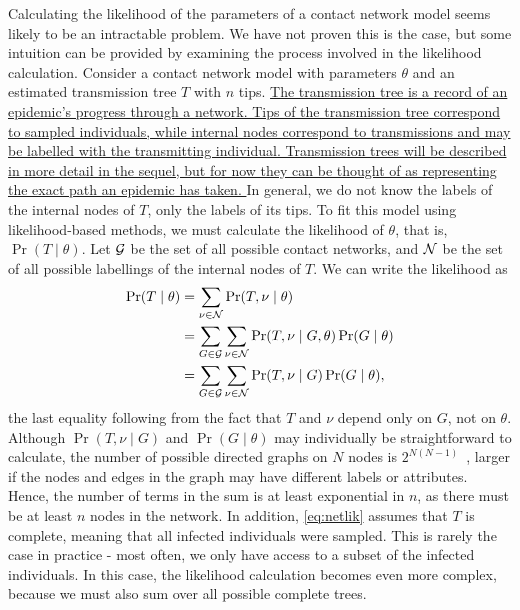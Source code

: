 Calculating the likelihood of the parameters of a contact network model seems
likely to be an intractable problem. We have not proven this is the case, but
some intuition can be provided by examining the process involved in the
likelihood calculation. Consider a contact network model with parameters
$\theta$ and an estimated transmission tree $T$ with $n$ tips.
{\color{blue}\uline{The transmission tree is a record of an epidemic's progress
through a network. Tips of the transmission tree correspond to sampled
individuals, while internal nodes correspond to transmissions and may be
labelled with the transmitting individual. Transmission trees will be described
in more detail in the sequel, but for now they can be thought of as
representing the exact path an epidemic has taken. }} In general, we do not
know the labels of the internal nodes of $T$, only the labels of its tips. To
fit this model using likelihood-based methods, we must calculate the likelihood
of $\theta$, that is, $\Pr(T \mid \theta)$. Let $\mathcal{G}$ be the set of all possible
contact networks, and $\mathcal{N}$ be the set of all possible labellings of the
internal nodes of $T$. We can write the likelihood as
\begin{align}
\begin{split}
  \label{eq:netlik}
  \Pr(T \mid \theta)
    &= \sum_{\nu \in \mathcal{N}} \Pr(T, \nu \mid \theta) \\
    &= \sum_{G \in \mathcal{G}} \sum_{\nu \in \mathcal{N}} \Pr(T, \nu \mid G, \theta) \Pr(G \mid \theta) \\
    &= \sum_{G \in \mathcal{G}} \sum_{\nu \in \mathcal{N}} \Pr(T, \nu \mid G) \Pr(G \mid \theta),
\end{split}
\end{align}
the last equality following from the fact that $T$ and $\nu$ depend only on
$G$, not on $\theta$. Although $\Pr(T, \nu \mid G)$ and $\Pr(G \mid \theta)$
may individually be straightforward to calculate, the number of possible
directed graphs on $N$ nodes is $2^{N(N-1)}$~\autocite{harary2014graphical},
larger if the nodes and edges in the graph may have different labels or
attributes. Hence, the number of terms in the sum is at least exponential in
$n$, as there must be at least $n$ nodes in the network. In addition,
\cref{eq:netlik} assumes that $T$ is complete, meaning that all infected
individuals were sampled. This is rarely the case in practice - most often, we
only have access to a subset of the infected individuals. In this case, the
likelihood calculation becomes even more complex, because we must also sum over
all possible complete trees.

